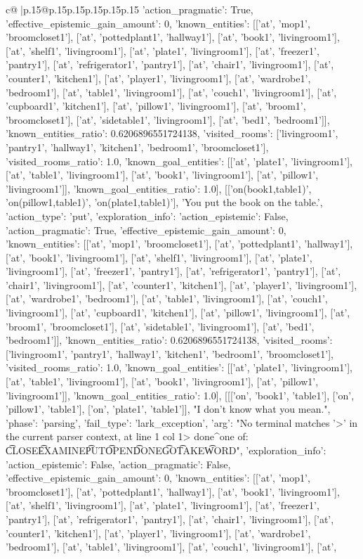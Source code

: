 \documentclass{article}
\begin{document}
{\begin{supertabular}{c@{$\;$}|p{.15\linewidth}@{}p{.15\linewidth}p{.15\linewidth}p{.15\linewidth}p{.15\linewidth}p{.15\linewidth}}
{{{'action_pragmatic': True, 'effective_epistemic_gain_amount': 0, 'known_entities': [['at', 'mop1', 'broomcloset1'], ['at', 'pottedplant1', 'hallway1'], ['at', 'book1', 'livingroom1'], ['at', 'shelf1', 'livingroom1'], ['at', 'plate1', 'livingroom1'], ['at', 'freezer1', 'pantry1'], ['at', 'refrigerator1', 'pantry1'], ['at', 'chair1', 'livingroom1'], ['at', 'counter1', 'kitchen1'], ['at', 'player1', 'livingroom1'], ['at', 'wardrobe1', 'bedroom1'], ['at', 'table1', 'livingroom1'], ['at', 'couch1', 'livingroom1'], ['at', 'cupboard1', 'kitchen1'], ['at', 'pillow1', 'livingroom1'], ['at', 'broom1', 'broomcloset1'], ['at', 'sidetable1', 'livingroom1'], ['at', 'bed1', 'bedroom1']], 'known_entities_ratio': 0.6206896551724138, 'visited_rooms': ['livingroom1', 'pantry1', 'hallway1', 'kitchen1', 'bedroom1', 'broomcloset1'], 'visited_rooms_ratio': 1.0, 'known_goal_entities': [['at', 'plate1', 'livingroom1'], ['at', 'table1', 'livingroom1'], ['at', 'book1', 'livingroom1'], ['at', 'pillow1', 'livingroom1']], 'known_goal_entities_ratio': 1.0}}], [['on(book1,table1)', 'on(pillow1,table1)', 'on(plate1,table1)'], 'You put the book on the table.', {'action_type': 'put', 'exploration_info': {'action_epistemic': False, 'action_pragmatic': True, 'effective_epistemic_gain_amount': 0, 'known_entities': [['at', 'mop1', 'broomcloset1'], ['at', 'pottedplant1', 'hallway1'], ['at', 'book1', 'livingroom1'], ['at', 'shelf1', 'livingroom1'], ['at', 'plate1', 'livingroom1'], ['at', 'freezer1', 'pantry1'], ['at', 'refrigerator1', 'pantry1'], ['at', 'chair1', 'livingroom1'], ['at', 'counter1', 'kitchen1'], ['at', 'player1', 'livingroom1'], ['at', 'wardrobe1', 'bedroom1'], ['at', 'table1', 'livingroom1'], ['at', 'couch1', 'livingroom1'], ['at', 'cupboard1', 'kitchen1'], ['at', 'pillow1', 'livingroom1'], ['at', 'broom1', 'broomcloset1'], ['at', 'sidetable1', 'livingroom1'], ['at', 'bed1', 'bedroom1']], 'known_entities_ratio': 0.6206896551724138, 'visited_rooms': ['livingroom1', 'pantry1', 'hallway1', 'kitchen1', 'bedroom1', 'broomcloset1'], 'visited_rooms_ratio': 1.0, 'known_goal_entities': [['at', 'plate1', 'livingroom1'], ['at', 'table1', 'livingroom1'], ['at', 'book1', 'livingroom1'], ['at', 'pillow1', 'livingroom1']], 'known_goal_entities_ratio': 1.0}}], [[['on', 'book1', 'table1'], ['on', 'pillow1', 'table1'], ['on', 'plate1', 'table1']], "I don't know what you mean.", {'phase': 'parsing', 'fail_type': 'lark_exception', 'arg': "No terminal matches '>' in the current parser context, at line 1 col 1\n\n> done\n^\nExpected one of: \n\t* CLOSE\n\t* EXAMINE\n\t* PUT\n\t* OPEN\n\t* DONE\n\t* GO\n\t* TAKE\n\t* WORD\n", 'exploration_info': {'action_epistemic': False, 'action_pragmatic': False, 'effective_epistemic_gain_amount': 0, 'known_entities': [['at', 'mop1', 'broomcloset1'], ['at', 'pottedplant1', 'hallway1'], ['at', 'book1', 'livingroom1'], ['at', 'shelf1', 'livingroom1'], ['at', 'plate1', 'livingroom1'], ['at', 'freezer1', 'pantry1'], ['at', 'refrigerator1', 'pantry1'], ['at', 'chair1', 'livingroom1'], ['at', 'counter1', 'kitchen1'], ['at', 'player1', 'livingroom1'], ['at', 'wardrobe1', 'bedroom1'], ['at', 'table1', 'livingroom1'], ['at', 'couch1', 'livingroom1'], ['at', }}}
\end{supertabular}}
\end{document}
